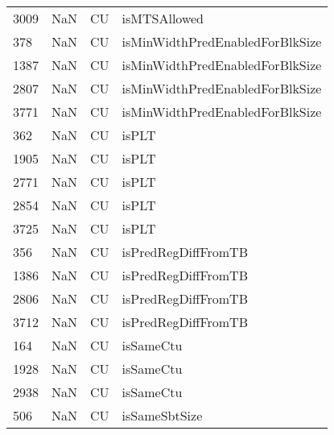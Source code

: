 \begin{tabular}{llll}
3009 &                   NaN &                         CU &                              isMTSAllowed \\
378  &                   NaN &                         CU &           isMinWidthPredEnabledForBlkSize \\
1387 &                   NaN &                         CU &           isMinWidthPredEnabledForBlkSize \\
2807 &                   NaN &                         CU &           isMinWidthPredEnabledForBlkSize \\
3771 &                   NaN &                         CU &           isMinWidthPredEnabledForBlkSize \\
362  &                   NaN &                         CU &                                     isPLT \\
1905 &                   NaN &                         CU &                                     isPLT \\
2771 &                   NaN &                         CU &                                     isPLT \\
2854 &                   NaN &                         CU &                                     isPLT \\
3725 &                   NaN &                         CU &                                     isPLT \\
356  &                   NaN &                         CU &                       isPredRegDiffFromTB \\
1386 &                   NaN &                         CU &                       isPredRegDiffFromTB \\
2806 &                   NaN &                         CU &                       isPredRegDiffFromTB \\
3712 &                   NaN &                         CU &                       isPredRegDiffFromTB \\
164  &                   NaN &                         CU &                                 isSameCtu \\
1928 &                   NaN &                         CU &                                 isSameCtu \\
2938 &                   NaN &                         CU &                                 isSameCtu \\
506  &                   NaN &                         CU &                             isSameSbtSize \\

\end{tabular}
